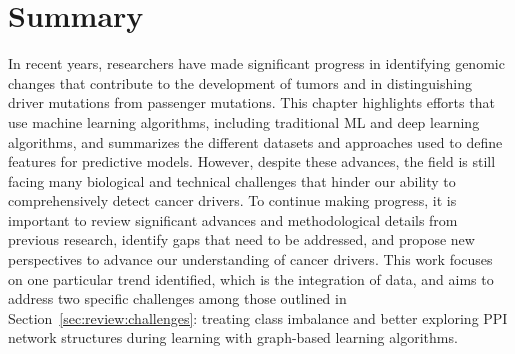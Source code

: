 \section{Summary}

In recent years, researchers have made significant progress in identifying genomic changes that contribute to the development of tumors and in distinguishing driver mutations from passenger mutations. This chapter highlights efforts that use machine learning algorithms, including traditional ML and deep learning algorithms, and summarizes the different datasets and approaches used to define features for predictive models. However, despite these advances, the field is still facing many biological and technical challenges that hinder our ability to comprehensively detect cancer drivers. To continue making progress, it is important to review significant advances and methodological details from previous research, identify gaps that need to be addressed, and propose new perspectives to advance our understanding of cancer drivers. This work focuses on one particular trend identified, which is the integration of data, and aims to address two specific challenges among those outlined in Section~\ref{sec:review:challenges}: treating class imbalance and better exploring PPI network structures during learning with graph-based learning algorithms.